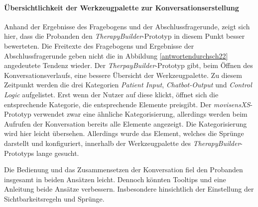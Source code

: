 \paragraph{Übersichtlichkeit der Werkzeugpalette zur Konversationserstellung}
Anhand der Ergebnisse des Fragebogens und der Abschlussfragerunde, zeigt sich hier, dass die Probanden den \emph{TherapyBuilder}-Prototyp in diesem Punkt besser bewerteten. Die Freitexte des Fragebogens und Ergebnisse der Abschlussfragerunde geben nicht die in Abbildung \ref{antwortendurchsch22} angedeutete Tendenz wieder. Der \emph{TherpayBuilder}-Prototyp gibt, beim  Öffnen des Konversationsverlaufs, eine bessere Übersicht der Werkzeugpalette. Zu diesem Zeitpunkt werden die drei Kategorien \emph{Patient Input}, \emph{Chatbot-Output} und \emph{Control Logic} aufgelistet. Erst wenn der Nutzer auf diese klickt, öffnet sich die entsprechende Kategorie, die entsprechende Elemente preisgibt. Der \emph{movisensXS}-Prototyp verwendet zwar eine ähnliche Kategorisierung, allerdings werden beim Aufrufen der Konversation bereits alle Elemente angezeigt. Die Kategorisierung wird hier leicht übersehen. Allerdings wurde das Element, welches die Sprünge darstellt und konfiguriert, innerhalb der Werkzeugpalette des \emph{TherapyBuilder}-Prototyps lange gesucht. 

Die Bedienung und das Zusammensetzen der Konversation fiel den Probanden insgesamt in beiden Ansätzen leicht. Dennoch könnten Tooltips und eine Anleitung beide Ansätze verbessern. Insbesondere hinsichtlich der Einstellung der Sichtbarkeitsregeln und Sprünge. 

